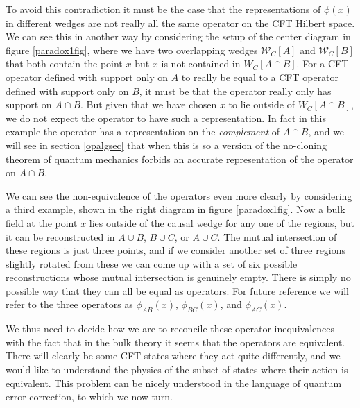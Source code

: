 \documentclass[12pt]{article}
\newcommand{\W}{\mathcal{W}}
\begin{document}
To avoid this contradiction it must be the case that the representations of $\phi(x)$ in different wedges are not really all the same operator on the CFT Hilbert space.  We can see this in another way by considering the setup of the center diagram in figure \ref{paradox1fig}, where we have two overlapping wedges $\W_C[A]$ and $\W_C[B]$ that both contain the point $x$ but $x$ is not contained in $W_C[A\cap B]$.  For a CFT operator defined with support only on $A$ to really be equal to a CFT operator defined with support only on $B$, it must be that the operator really only has support on $A\cap B$.  But given that we have chosen $x$ to lie outside of $W_C[A\cap B]$, we do not expect the operator to have such a representation.  In fact in this example the operator has a representation on the \textit{complement} of $A \cap B$, and we will see in section \eqref{opalgsec} that when this is so a version of the no-cloning theorem of quantum mechanics forbids an accurate representation of the operator on $A\cap B$.

We can see the non-equivalence of the operators even more clearly by considering a third example, shown in the right diagram in figure \ref{paradox1fig}.  Now a bulk field at the point $x$ lies outside of the causal wedge for any one of the regions, but it can be reconstructed in $A \cup B$, $B \cup C$, or $A \cup C$.  The mutual intersection of these regions is just three points, and if we consider another set of three regions slightly rotated from these we can come up with a set of six possible reconstructions whose mutual intersection is genuinely empty.  There is simply no possible way that they can all be equal as operators.  For future reference we will refer to the three operators as $\phi_{AB}(x)$, $\phi_{BC}(x)$, and $\phi_{AC}(x)$.  

We thus need to decide how we are to reconcile these operator inequivalences with the fact that in the bulk theory it seems that the operators are equivalent.  There will clearly be some CFT states where they act quite differently, and we would like to understand the physics of the subset of states where their action is equivalent.  This problem can be nicely understood in the language of quantum error correction, to which we now turn.
\end{document}
